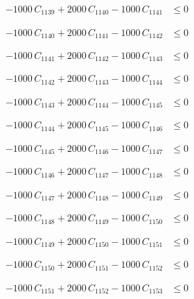\documentclass[a4paper,11pt]{article}
\begin{document}
\begin{align}
-1000\,C_{1139} + 2000\,C_{1140} - 1000\,C_{1141} &\leq 0 \nonumber
\end{align}

\begin{align}
-1000\,C_{1140} + 2000\,C_{1141} - 1000\,C_{1142} &\leq 0 \nonumber
\end{align}

\begin{align}
-1000\,C_{1141} + 2000\,C_{1142} - 1000\,C_{1143} &\leq 0 \nonumber
\end{align}

\begin{align}
-1000\,C_{1142} + 2000\,C_{1143} - 1000\,C_{1144} &\leq 0 \nonumber
\end{align}

\begin{align}
-1000\,C_{1143} + 2000\,C_{1144} - 1000\,C_{1145} &\leq 0 \nonumber
\end{align}

\begin{align}
-1000\,C_{1144} + 2000\,C_{1145} - 1000\,C_{1146} &\leq 0 \nonumber
\end{align}

\begin{align}
-1000\,C_{1145} + 2000\,C_{1146} - 1000\,C_{1147} &\leq 0 \nonumber
\end{align}

\begin{align}
-1000\,C_{1146} + 2000\,C_{1147} - 1000\,C_{1148} &\leq 0 \nonumber
\end{align}

\begin{align}
-1000\,C_{1147} + 2000\,C_{1148} - 1000\,C_{1149} &\leq 0 \nonumber
\end{align}

\begin{align}
-1000\,C_{1148} + 2000\,C_{1149} - 1000\,C_{1150} &\leq 0 \nonumber
\end{align}

\begin{align}
-1000\,C_{1149} + 2000\,C_{1150} - 1000\,C_{1151} &\leq 0 \nonumber
\end{align}

\begin{align}
-1000\,C_{1150} + 2000\,C_{1151} - 1000\,C_{1152} &\leq 0 \nonumber
\end{align}

\begin{align}
-1000\,C_{1151} + 2000\,C_{1152} - 1000\,C_{1153} &\leq 0 \nonumber
\end{align}
\end{document}
